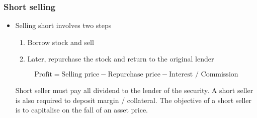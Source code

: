 \documentclass[../notes_compiled.tex]{subfiles}
\begin{document}
\subsubsection{Short selling}
\begin{itemize}
\item Selling short involves two steps

\begin{enumerate}
\item Borrow stock and sell
\item Later, repurchase the stock and return to the original lender
\end{enumerate}

\begin{equation}
\text{Profit} = \text{Selling price} - \text{Repurchase price} - \text{Interest / Commission}
\end{equation}

Short seller must pay all dividend to the lender of the security. A short seller is also required to deposit margin / collateral. The objective of a short seller is to capitalise on the fall of an asset price.

\end{itemize}
\end{document}
